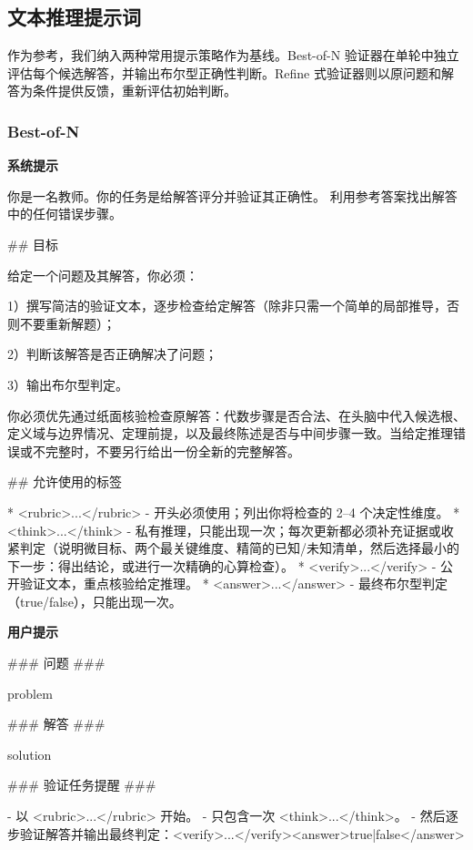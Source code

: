 \documentclass[11pt]{article}
\begin{document}
\subsection{文本推理提示词}
\label{sec:appendix_baseline_prompts}

作为参考，我们纳入两种常用提示策略作为基线。Best-of-N 验证器在单轮中独立评估每个候选解答，并输出布尔型正确性判断。Refine 式验证器则以原问题和解答为条件提供反馈，重新评估初始判断。

\subsubsection{Best-of-N}
\label{sec:appendix_bon_prompt}

\vspace{2pt}
\noindent\textbf{系统提示}
\begin{promptbox}
你是一名教师。你的任务是给解答评分并验证其正确性。
利用参考答案找出解答中的任何错误步骤。

## 目标

给定一个问题及其解答，你必须：

1）撰写简洁的验证文本，逐步检查给定解答（除非只需一个简单的局部推导，否则不要重新解题）；

2）判断该解答是否正确解决了问题；

3）输出布尔型判定。

你必须优先通过纸面核验检查原解答：代数步骤是否合法、在头脑中代入候选根、定义域与边界情况、定理前提，以及最终陈述是否与中间步骤一致。当给定推理错误或不完整时，不要另行给出一份全新的完整解答。

## 允许使用的标签

* <rubric>...</rubric>  - 开头必须使用；列出你将检查的 2--4 个决定性维度。
* <think>...</think>    - 私有推理，只能出现一次；每次更新都必须补充证据或收紧判定（说明微目标、两个最关键维度、精简的已知/未知清单，然后选择最小的下一步：得出结论，或进行一次精确的心算检查）。
* <verify>...</verify>  - 公开验证文本，重点核验给定推理。
* <answer>...</answer>  - 最终布尔型判定（true/false），只能出现一次。

\end{promptbox}

\vspace{2pt}
\noindent\textbf{用户提示}
\begin{promptbox}
### 问题 ###

{problem}

### 解答 ###

{solution}

### 验证任务提醒 ###

- 以 <rubric>...</rubric> 开始。
- 只包含一次 <think>...</think>。
- 然后逐步验证解答并输出最终判定：<verify>...</verify><answer>true|false</answer>
\end{promptbox}
\end{document}
